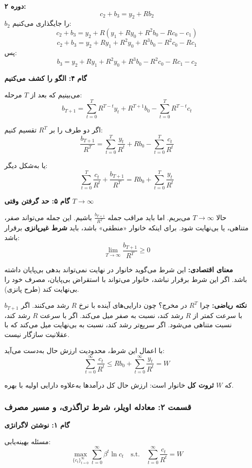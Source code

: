 \documentclass[12pt,a4paper]{article}
\begin{document}
\textbf{دوره ۲:}
\[
	c_2 + b_3 = y_2 + R b_2
\]
$b_2$ را جایگذاری می‌کنیم:
\[
	c_2 + b_3 = y_2 + R(y_1 + R y_0 + R^2 b_0 - R c_0 - c_1)
\]
\[
	c_2 + b_3 = y_2 + R y_1 + R^2 y_0 + R^3 b_0 - R^2 c_0 - R c_1
\]
پس:
\[
	b_3 = y_2 + R y_1 + R^2 y_0 + R^3 b_0 - R^2 c_0 - R c_1 - c_2
\]

\textbf{گام ۴: الگو را کشف می‌کنیم}

می‌بینیم که بعد از $T$ مرحله:
\[
	b_{T+1} = \sum_{t=0}^{T} R^{T-t} y_t + R^{T+1} b_0 - \sum_{t=0}^{T} R^{T-t} c_t
\]

اگر دو طرف را بر $R^T$ تقسیم کنیم:
\[
	\frac{b_{T+1}}{R^T} = \sum_{t=0}^{T} \frac{y_t}{R^t} + R b_0 - \sum_{t=0}^{T} \frac{c_t}{R^t}
\]

یا به‌شکل دیگر:
\[
	\sum_{t=0}^{T} \frac{c_t}{R^t} + \frac{b_{T+1}}{R^T} = R b_0 + \sum_{t=0}^{T} \frac{y_t}{R^t}
\]

\textbf{گام ۵: حد گرفتن وقتی $T \to \infty$}

حالا $T \to \infty$ می‌بریم. اما باید مراقب جمله $\frac{b_{T+1}}{R^T}$ باشیم. این جمله می‌تواند صفر، متناهی، یا بی‌نهایت شود. برای اینکه خانوار «منطقی» باشد، باید \textbf{شرط غیرپانزی} برقرار باشد:
\[
	\lim_{T \to \infty} \frac{b_{T+1}}{R^T} \geq 0
\]

\textbf{معنای اقتصادی:} این شرط می‌گوید خانوار در نهایت نمی‌تواند بدهی بی‌پایان داشته باشد. اگر این شرط برقرار نباشد، خانوار می‌تواند با استقراض بی‌پایان، مصرف خود را بی‌نهایت کند (طرح پانزی).

\textbf{نکته ریاضی:} چرا $R^T$ در مخرج؟ چون دارایی‌های آینده با نرخ $R$ رشد می‌کنند. اگر $b_{T+1}$ با سرعت کمتر از $R$ رشد کند، نسبت به صفر میل می‌کند. اگر با سرعت $R$ رشد کند، نسبت متناهی می‌شود. اگر سریع‌تر رشد کند، نسبت به بی‌نهایت میل می‌کند که با عقلانیت سازگار نیست.

با اعمال این شرط، محدودیت ارزش حال به‌دست می‌آید:
\[
	\boxed{\sum_{t=0}^{\infty} \frac{c_t}{R^t} \leq R b_0 + \sum_{t=0}^{\infty} \frac{y_t}{R^t} = W}
\]

که $W$ \textbf{ثروت کل} خانوار است: ارزش حال کل درآمدها به‌علاوه دارایی اولیه با بهره.

\subsubsection{قسمت ۲: معادله اویلر، شرط تراگذری، و مسیر مصرف}

\textbf{گام ۱: نوشتن لاگرانژی}

مسئله بهینه‌یابی:
\[
	\max_{\{c_t\}_{t=0}^{\infty}} \sum_{t=0}^{\infty} \beta^t \ln c_t
	\quad \text{s.t.} \quad
	\sum_{t=0}^{\infty} \frac{c_t}{R^t} = W
\]
\end{document}

